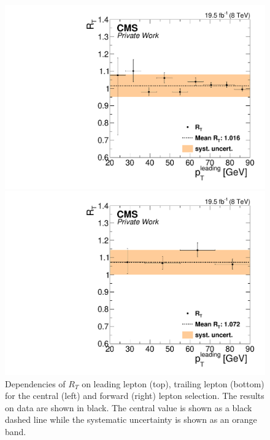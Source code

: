 \begin{figure}[htbp]
\begin{minipage}[t]{0.49\textwidth}
\end{minipage}
\begin{minipage}[t]{0.49\textwidth}
  \includegraphics[width=\textwidth]{plots/BG/trigger/Triggereff_SFvsOF_Syst_AlphaT_HighHTExclusiveCentral_Full2012_LeadingPt_trailingPt20.pdf}
\end{minipage}
\begin{minipage}[t]{0.49\textwidth}
\includegraphics[width=\textwidth]{plots/BG/trigger/Triggereff_SFvsOF_Syst_AlphaT_HighHTExclusiveForward_Full2012_LeadingPt_trailingPt20.pdf}
\end{minipage}

\caption{Dependencies of $R_T$ on leading lepton \pt (top), trailing lepton \pt (bottom) for the central (left) and forward (right) lepton selection. The results on data are shown in black. The central value is shown as a black dashed line while the systematic uncertainty is shown as an orange band.}
\label{fig:RTDependenciesApp1}
\end{figure}  

